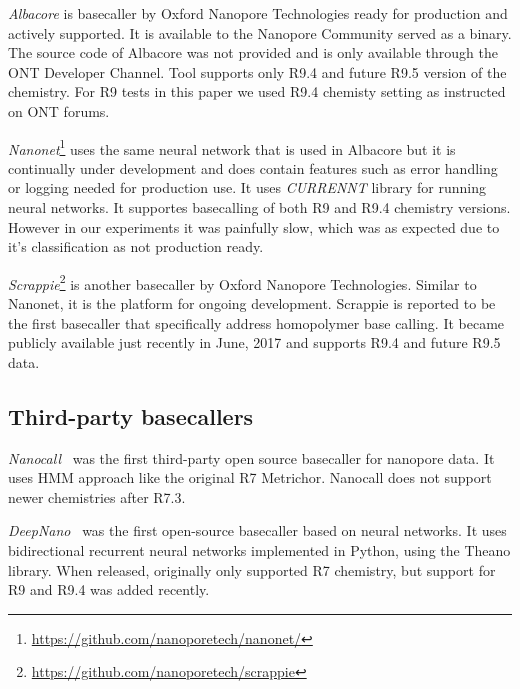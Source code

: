 \documentclass[runningheads,a4paper]{llncs}
\begin{document}
\textit{Albacore} is basecaller by Oxford Nanopore Technologies ready for production and actively supported.
It is available to the Nanopore Community served as a binary. The source code of Albacore was not provided and is only available through the ONT Developer Channel. Tool supports only R9.4 and future R9.5 version of the chemistry. For R9 tests in this paper we used R9.4 chemisty setting as instructed on ONT forums.

\textit{Nanonet}\footnote{\url{https://github.com/nanoporetech/nanonet/}} uses the same neural network that is used in Albacore but it is continually under development and does contain features such as error handling or logging needed for production use. It uses \textit{CURRENNT} library for running neural networks. It supportes basecalling of both R9 and R9.4 chemistry versions. However in our experiments it was painfully slow, which was as expected due to it's classification as not production ready.

\textit{Scrappie}\footnote{\url{https://github.com/nanoporetech/scrappie}} is another basecaller by Oxford Nanopore Technologies. Similar to Nanonet, it is the platform for ongoing development. Scrappie is reported to be the first basecaller  that specifically address homopolymer base calling. It became publicly available just recently in June, 2017 and supports R9.4 and future R9.5 data.

\subsection{Third-party basecallers}
\textit{Nanocall}~\cite{David046086} was the first third-party open source basecaller for nanopore data. It uses HMM approach like the original R7 Metrichor. Nanocall does not support newer chemistries after R7.3.

\textit{DeepNano}~\cite{Boza2017}  was the first open-source basecaller based on neural networks. It uses bidirectional recurrent neural networks implemented in Python, using the Theano library. When released, originally only supported R7 chemistry, but support for R9 and R9.4 was added recently.
\end{document}
